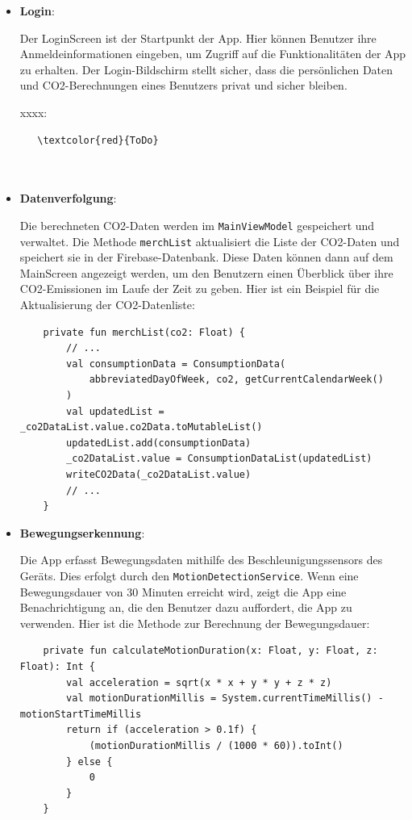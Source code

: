 \documentclass{article}
\begin{document}
\begin{itemize}
    
            \item \textbf{Login}:
            
             Der LoginScreen ist der Startpunkt der App. Hier können Benutzer ihre Anmeldeinformationen eingeben, um Zugriff auf die Funktionalitäten der App zu erhalten. Der Login-Bildschirm stellt sicher, dass die persönlichen Daten und CO2-Berechnungen eines Benutzers privat und sicher bleiben.

    xxxx:
    
    \begin{lstlisting}
   \textcolor{red}{ToDo}
   
   
    \end{lstlisting}
    
    
    
        \item \textbf{Datenverfolgung}:
        
    Die berechneten CO2-Daten werden im \texttt{MainViewModel} gespeichert und verwaltet. Die Methode \texttt{merchList} aktualisiert die Liste der CO2-Daten und speichert sie in der Firebase-Datenbank. Diese Daten können dann auf dem MainScreen angezeigt werden, um den Benutzern einen Überblick über ihre CO2-Emissionen im Laufe der Zeit zu geben. Hier ist ein Beispiel für die Aktualisierung der CO2-Datenliste:
    
    \begin{lstlisting}
    private fun merchList(co2: Float) {
        // ...
        val consumptionData = ConsumptionData(
            abbreviatedDayOfWeek, co2, getCurrentCalendarWeek()
        )
        val updatedList = _co2DataList.value.co2Data.toMutableList()
        updatedList.add(consumptionData)
        _co2DataList.value = ConsumptionDataList(updatedList)
        writeCO2Data(_co2DataList.value)
        // ...
    }
    \end{lstlisting}

    \item \textbf{Bewegungserkennung}:
    
    Die App erfasst Bewegungsdaten mithilfe des Beschleunigungssensors des Geräts. Dies erfolgt durch den \texttt{MotionDetectionService}. Wenn eine Bewegungsdauer von 30 Minuten erreicht wird, zeigt die App eine Benachrichtigung an, die den Benutzer dazu auffordert, die App zu verwenden. Hier ist die Methode zur Berechnung der Bewegungsdauer:
    
    \begin{lstlisting}
    private fun calculateMotionDuration(x: Float, y: Float, z: Float): Int {
        val acceleration = sqrt(x * x + y * y + z * z)
        val motionDurationMillis = System.currentTimeMillis() - motionStartTimeMillis
        return if (acceleration > 0.1f) {
            (motionDurationMillis / (1000 * 60)).toInt()
        } else {
            0
        }
    }
    \end{lstlisting}



\end{itemize}
\end{document}
